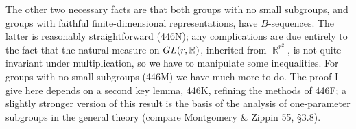 {The other two necessary facts are that both groups with no small
subgroups, and groups with faithful finite-dimensional representations,
have $B$-sequences.   The latter is reasonably straightforward (446N);
any complications are due entirely to the fact that the natural measure
on $GL(r,\Bbb R)$, inherited from $\BbbR^{r^2}$, is not quite invariant
under multiplication, so we have to manipulate some inequalities.   For
groups with no small subgroups (446M) we have much more to do.   The
proof I give here depends on a second key lemma, 446K, refining the
methods of 446F;  a slightly stronger version of this result is the
basis of the analysis of one-parameter subgroups in the general theory
(compare {\smc Montgomery \& Zippin 55}, \S3.8).

}%

\discrpage

